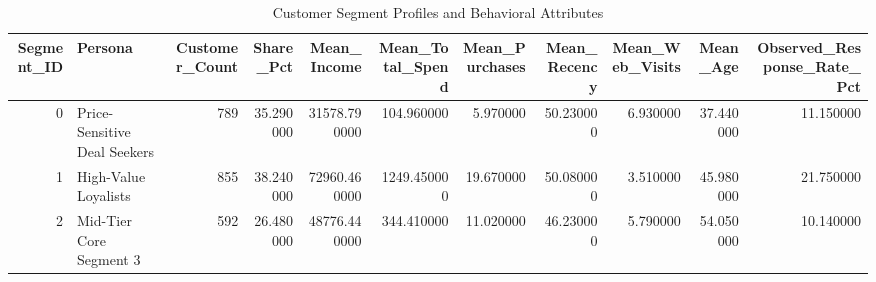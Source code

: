 \begin{table}
\caption{Customer Segment Profiles and Behavioral Attributes}
\label{tab:segment_profiles}
\begin{tabular}{rlrrrrrrrrr}
\toprule
Segment_ID & Persona & Customer_Count & Share_Pct & Mean_Income & Mean_Total_Spend & Mean_Purchases & Mean_Recency & Mean_Web_Visits & Mean_Age & Observed_Response_Rate_Pct \\
\midrule
0 & Price-Sensitive Deal Seekers & 789 & 35.290000 & 31578.790000 & 104.960000 & 5.970000 & 50.230000 & 6.930000 & 37.440000 & 11.150000 \\
1 & High-Value Loyalists & 855 & 38.240000 & 72960.460000 & 1249.450000 & 19.670000 & 50.080000 & 3.510000 & 45.980000 & 21.750000 \\
2 & Mid-Tier Core Segment 3 & 592 & 26.480000 & 48776.440000 & 344.410000 & 11.020000 & 46.230000 & 5.790000 & 54.050000 & 10.140000 \\
\bottomrule
\end{tabular}
\end{table}
